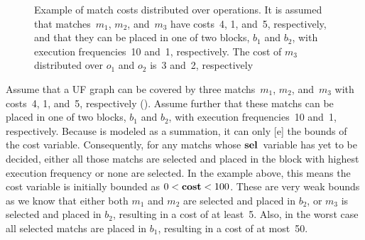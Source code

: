 \begin{figure}
  \caption[Example of match costs distributed over operations]%
          {%
            Example of match costs distributed over operations.
            It is assumed that matches~$m_1$, $m_2$, and~$m_3$ have
            costs~\num{4}, \num{1}, and~\num{5}, respectively, and that they can
            be placed in one of two blocks, $b_1$ and $b_2$, with execution
            frequencies~\num{10} and~\num{1}, respectively.
            The cost of $m_3$ distributed over $o_1$ and $o_2$ is~\num{3}
            and~\num{2}, respectively%
          }
\end{figure}
%
Assume that a \gls{UF graph} can be covered by three \glspl{match}~$m_1$, $m_2$,
and~$m_3$ with costs~\num{4}, \num{1}, and~\num{5}, respectively
().
%
Assume further that these \glspl{match} can be placed in one of two blocks,
$b_1$ and $b_2$, with execution frequencies~\num{10} and~\num{1}, respectively.
%
Because  is modeled as a summation, it can
only [e] the bounds of the \gls{cost variable}.
%
Consequently, for any \glspl{match} whose $\mVar{sel}$~\gls{variable} has yet to
be decided, either all those \glspl{match} are selected and placed in the
\gls{block} with highest execution frequency or none are selected.
%
In the example above, this means the \gls{cost variable} is initially bounded as
\mbox{$0 < \mVar{cost} < 100$}.
%
These are very weak bounds as we know that either both $m_1$ and $m_2$ are
selected and placed in $b_2$, or $m_3$ is selected and placed in $b_2$,
resulting in a cost of at least~\num{5}.
%
Also, in the worst case all selected \glspl{match} are placed in $b_1$,
resulting in a cost of at most~\num{50}.


